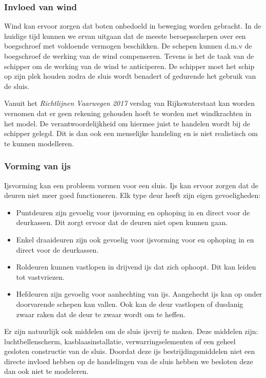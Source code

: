 \documentclass{article}
\begin{document}

\subsubsection{Invloed van wind} %
Wind kan ervoor zorgen dat boten onbedoeld in beweging worden gebracht. In de huidige tijd kunnen we ervan uitgaan dat de meeste beroepsschepen over een boegschroef  met voldoende vermogen beschikken. De schepen kunnen d.m.v de boegschroef de werking van de wind compenseren. Tevens is het de taak van de schipper om de werking van de wind te anticiperen. De schipper moet het schip op zijn plek houden zodra de sluis wordt benadert of gedurende het gebruik van de sluis.

Vanuit het \textit{Richtlijnen Vaarwegen 2017} verslag van Rijkswaterstaat \cite{rijkswaterstaat2017} kan worden vernomen dat er geen rekening gehouden hoeft te worden met windkrachten in het model. De verantwoordelijkheid om hiermee juist te handelen wordt bij de schipper gelegd. Dit is dan ook een menselijke handeling en is niet realistisch om te kunnen modelleren.

\vskip0.5cm

\subsubsection{Vorming van ijs}
Ijsvorming kan een probleem vormen voor een sluis. Ijs kan ervoor zorgen dat de deuren niet meer goed functioneren. Elk type deur heeft zijn eigen gevoeligheden:
\begin{itemize}
\item Puntdeuren zijn gevoelig voor ijsvorming en ophoping in en direct voor de deurkassen. Dit zorgt ervoor dat de deuren niet open kunnen gaan.
\item Enkel draaideuren zijn ook gevoelig voor ijsvorming voor en ophoping in en direct voor de deurkassen.
\item Roldeuren kunnen vastlopen in drijvend ijs dat zich ophoopt. Dit kan leiden tot vastvriezen.
\item Hefdeuren zijn gevoelig voor aanhechting van ijs. Aangehecht ijs kan op onder doorvarende schepen kan vallen. Ook kan de deur vastlopen of dusdanig zwaar raken dat de deur te zwaar wordt om te heffen.
\end{itemize}

Er zijn natuurlijk ook middelen om de sluis ijsvrij te maken. Deze middelen zijn: luchtbellenscherm, kasblaasinstallatie, verwarringselementen of een geheel gesloten constructie van de sluis.
Doordat deze ijs bestrijdingsmiddelen niet een directe invloed hebben op de handelingen van de sluis hebben we besloten deze dan ook niet te modeleren.
\end{document}
